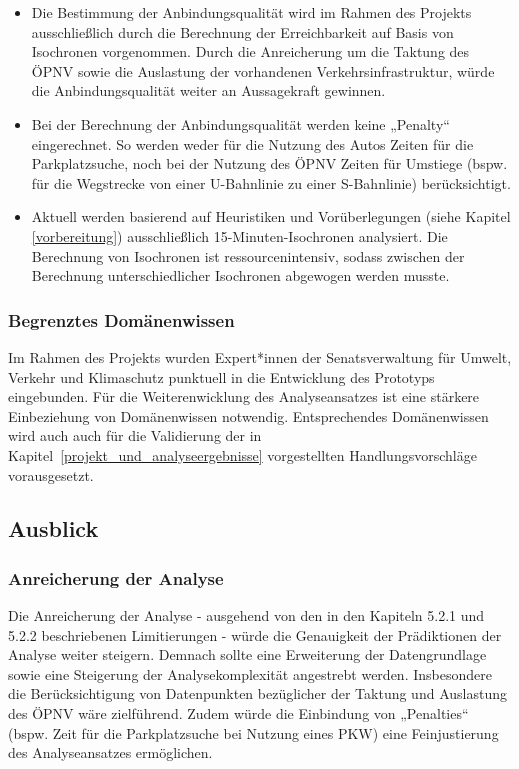 \begin{itemize}
    \item Die Bestimmung der Anbindungsqualität wird im Rahmen des Projekts ausschließlich durch die Berechnung der Erreichbarkeit auf Basis von Isochronen vorgenommen. Durch die Anreicherung um die Taktung des ÖPNV sowie die Auslastung der vorhandenen Verkehrsinfrastruktur, würde die Anbindungsqualität weiter an Aussagekraft gewinnen.
    \item Bei der Berechnung der Anbindungsqualität werden keine „Penalty“ eingerechnet. So werden weder für die Nutzung des Autos Zeiten für die Parkplatzsuche, noch bei der Nutzung des ÖPNV Zeiten für Umstiege (bspw. für die Wegstrecke von einer U-Bahnlinie zu einer S-Bahnlinie) berücksichtigt.
    \item Aktuell werden basierend auf Heuristiken und Vorüberlegungen (siehe Kapitel \ref{vorbereitung}) ausschließlich 15-Minuten-Isochronen analysiert​. Die Berechnung von Isochronen ist ressourcenintensiv, sodass zwischen der Berechnung unterschiedlicher Isochronen abgewogen werden musste.
\end{itemize}

\subsubsection{Begrenztes Domänenwissen}
Im Rahmen des Projekts wurden Expert*innen der Senatsverwaltung für Umwelt, Verkehr und Klimaschutz punktuell in die Entwicklung des Prototyps eingebunden. Für die Weiterenwicklung des Analyseansatzes ist eine stärkere Einbeziehung von Domänenwissen notwendig. Entsprechendes Domänenwissen wird auch auch für die Validierung der in Kapitel~\ref{projekt_und_analyseergebnisse} vorgestellten Handlungsvorschläge vorausgesetzt.

\subsection{Ausblick}

\subsubsection{Anreicherung der Analyse}
Die Anreicherung der Analyse - ausgehend von den in den Kapiteln 5.2.1 und 5.2.2 beschriebenen Limitierungen - würde die  Genauigkeit der Prädiktionen der Analyse weiter steigern. Demnach sollte eine Erweiterung der Datengrundlage sowie eine Steigerung der Analysekomplexität angestrebt werden. Insbesondere die Berücksichtigung von Datenpunkten bezüglicher der Taktung und Auslastung des ÖPNV wäre zielführend. Zudem würde die Einbindung von „Penalties“ (bspw. Zeit für die Parkplatzsuche bei Nutzung eines PKW) eine Feinjustierung des Analyseansatzes ermöglichen.

